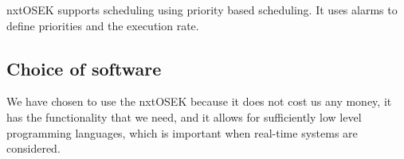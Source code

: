 nxtOSEK supports scheduling using priority based scheduling. It uses alarms to define priorities and the execution rate.

\subsection{Choice of software}


We have chosen to use the nxtOSEK because it does not cost us any money, it has the functionality that we need, and it allows for sufficiently low level programming languages, which is important when real-time systems are considered.


